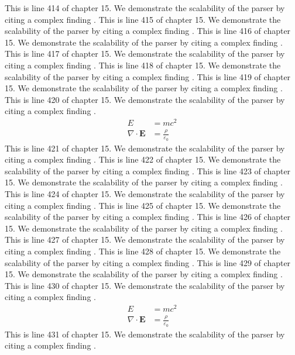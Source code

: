 This is line 414 of chapter 15. We demonstrate the scalability of the parser by citing a complex finding \cite{ref15_414}.
This is line 415 of chapter 15. We demonstrate the scalability of the parser by citing a complex finding \cite{ref15_415}.
This is line 416 of chapter 15. We demonstrate the scalability of the parser by citing a complex finding \cite{ref15_416}.
This is line 417 of chapter 15. We demonstrate the scalability of the parser by citing a complex finding \cite{ref15_417}.
This is line 418 of chapter 15. We demonstrate the scalability of the parser by citing a complex finding \cite{ref15_418}.
This is line 419 of chapter 15. We demonstrate the scalability of the parser by citing a complex finding \cite{ref15_419}.
This is line 420 of chapter 15. We demonstrate the scalability of the parser by citing a complex finding \cite{ref15_420}.
\begin{align*}
  E &= mc^2 \\
  \nabla \cdot \mathbf{E} &= \frac{\rho}{\varepsilon_0}
\end{align*}
This is line 421 of chapter 15. We demonstrate the scalability of the parser by citing a complex finding \cite{ref15_421}.
This is line 422 of chapter 15. We demonstrate the scalability of the parser by citing a complex finding \cite{ref15_422}.
This is line 423 of chapter 15. We demonstrate the scalability of the parser by citing a complex finding \cite{ref15_423}.
This is line 424 of chapter 15. We demonstrate the scalability of the parser by citing a complex finding \cite{ref15_424}.
This is line 425 of chapter 15. We demonstrate the scalability of the parser by citing a complex finding \cite{ref15_425}.
This is line 426 of chapter 15. We demonstrate the scalability of the parser by citing a complex finding \cite{ref15_426}.
This is line 427 of chapter 15. We demonstrate the scalability of the parser by citing a complex finding \cite{ref15_427}.
This is line 428 of chapter 15. We demonstrate the scalability of the parser by citing a complex finding \cite{ref15_428}.
This is line 429 of chapter 15. We demonstrate the scalability of the parser by citing a complex finding \cite{ref15_429}.
This is line 430 of chapter 15. We demonstrate the scalability of the parser by citing a complex finding \cite{ref15_430}.
\begin{align*}
  E &= mc^2 \\
  \nabla \cdot \mathbf{E} &= \frac{\rho}{\varepsilon_0}
\end{align*}
This is line 431 of chapter 15. We demonstrate the scalability of the parser by citing a complex finding \cite{ref15_431}.
